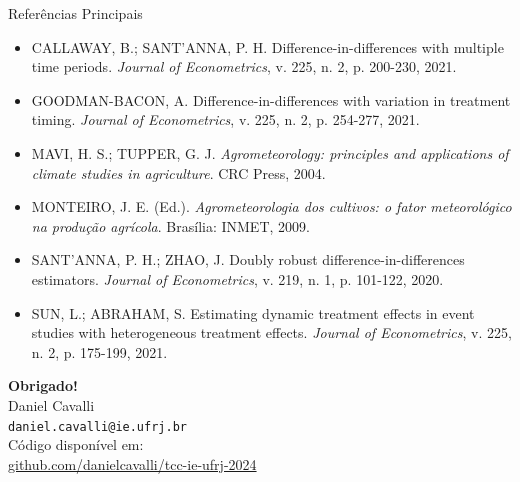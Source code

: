 \documentclass[10pt,aspectratio=169]{beamer}
\begin{document}
\begin{frame}[allowframebreaks]{Referências Principais}
\footnotesize
\begin{itemize}
    \item CALLAWAY, B.; SANT'ANNA, P. H. Difference-in-differences with multiple time periods. \textit{Journal of Econometrics}, v. 225, n. 2, p. 200-230, 2021.
    
    \item GOODMAN-BACON, A. Difference-in-differences with variation in treatment timing. \textit{Journal of Econometrics}, v. 225, n. 2, p. 254-277, 2021.
    
    \item MAVI, H. S.; TUPPER, G. J. \textit{Agrometeorology: principles and applications of climate studies in agriculture}. CRC Press, 2004.
    
    \item MONTEIRO, J. E. (Ed.). \textit{Agrometeorologia dos cultivos: o fator meteorológico na produção agrícola}. Brasília: INMET, 2009.
    
    \item SANT'ANNA, P. H.; ZHAO, J. Doubly robust difference-in-differences estimators. \textit{Journal of Econometrics}, v. 219, n. 1, p. 101-122, 2020.
    
    \item SUN, L.; ABRAHAM, S. Estimating dynamic treatment effects in event studies with heterogeneous treatment effects. \textit{Journal of Econometrics}, v. 225, n. 2, p. 175-199, 2021.
\end{itemize}
\end{frame}

\begin{frame}{}
\centering
\Large
\textbf{Obrigado!}\\
\vspace{1cm}
\normalsize
Daniel Cavalli\\
\texttt{daniel.cavalli@ie.ufrj.br}\\
\vspace{0.5cm}
Código disponível em:\\
\url{github.com/danielcavalli/tcc-ie-ufrj-2024}
\end{frame}

\appendix
\end{document}
